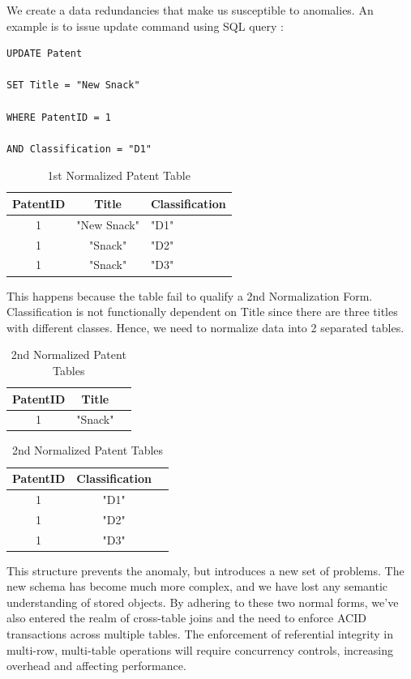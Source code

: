 \documentclass{sig-alternate}
\begin{document}
{We create a data redundancies that make us susceptible to anomalies. An example is to issue update command using SQL query :

\begin{lstlisting}[caption=Json Example]
UPDATE Patent 

SET Title = "New Snack"  

WHERE PatentID = 1 

AND Classification = "D1"
\end{lstlisting}

\begin{table}[htb]
\begin{tabular}{|c|c|l|} \hline
PatentID&Title&Classification\\ \hline
1& "New Snack"& "D1"\\ \hline
1& "Snack"& "D2"\\ \hline
1& "Snack"& "D3"\\ \hline
\end{tabular}
\centering
\caption{1st Normalized Patent Table}
\end{table}

This happens because the table fail to qualify a 2nd Normalization Form. Classification is not functionally dependent on Title since there are three titles with different classes. Hence, we need to normalize data into 2 separated tables.

\begin{table}[htb]
\centering
\begin{tabular}{|c|c|l|} \hline
PatentID&Title\\ \hline
1& "Snack"\\ \hline
\end{tabular}

\begin{tabular}{|c|c|l|} \hline
PatentID&Classification\\ \hline
1& "D1"\\ \hline
1& "D2"\\ \hline
1& "D3"\\ \hline
\end{tabular}
\centering

\centering
\caption{2nd Normalized Patent Tables}
\end{table}

This structure prevents the anomaly, but introduces a new set of problems. The new schema has become much more complex, and we have lost any semantic understanding of stored objects. By adhering to these two normal forms, we've also entered the realm of cross-table joins and the need to enforce ACID transactions across multiple tables. The enforcement of referential integrity in multi-row, multi-table operations will require concurrency controls, increasing overhead and affecting performance.

}
\end{document}

